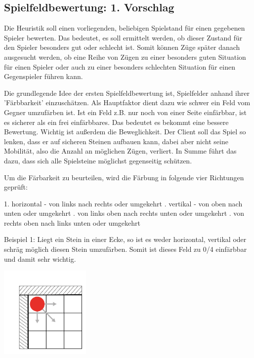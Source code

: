\documentclass[12pt,a4paper,bibliography=totocnumbered,listof=totocnumbered]{scrartcl}
\begin{document}
    \subsection{Spielfeldbewertung: 1. Vorschlag}
    Die Heuristik soll einen vorliegenden, beliebigen Spielstand für einen gegebenen Spieler bewerten. Das bedeutet, es soll ermittelt werden, ob dieser Zustand für den Spieler besonders gut oder schlecht ist. Somit können Züge später danach ausgesucht werden, ob eine Reihe von Zügen zu einer besonders guten Situation für einen Spieler oder auch zu einer besonders schlechten Situation für einen Gegenspieler führen kann.

    Die grundlegende Idee der ersten Spielfeldbewertung ist, Spielfelder anhand ihrer 'Färbbarkeit' einzuschätzen. Als Hauptfaktor dient dazu wie schwer ein Feld vom Gegner umzufärben ist. Ist ein Feld z.B. nur noch von einer Seite einfärbbar, ist es sicherer als ein frei einfärbbares. Das bedeutet es bekommt eine bessere Bewertung. Wichtig ist außerdem die Beweglichkeit. Der Client soll das Spiel so lenken, dass er auf sicheren Steinen aufbauen kann, dabei aber nicht seine Mobilität, also die Anzahl an möglichen Zügen, verliert. In Summe führt das dazu, dass sich alle Spielsteine möglichst gegenseitig schützen.


    Um die Färbarkeit zu beurteilen, wird die Färbung in folgende vier Richtungen geprüft:

    1. horizontal - von links nach rechts oder umgekehrt . vertikal - von oben nach unten oder umgekehrt . von links oben nach rechts unten oder umgekehrt . von rechts oben nach links unten oder umgekehrt \newline


    Beispiel 1: Liegt ein Stein in einer Ecke, so ist es weder horizontal, vertikal oder schräg möglich diesen Stein umzufärben. Somit ist dieses Feld zu 0/4 einfärbbar und damit sehr wichtig.

    \includegraphics[width=0.33\textwidth]{pics/Kapitel_3/Kapitel_3_pic1.png}
\end{document}
